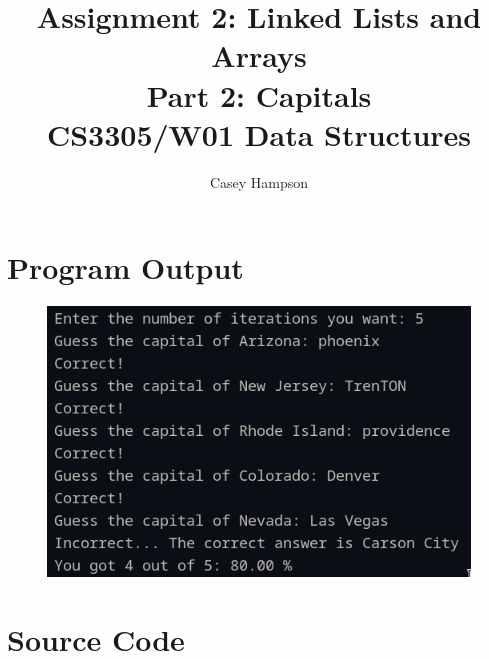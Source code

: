 \documentclass{article}
\title{Assignment 2: Linked Lists and Arrays \\[5pt] Part 2: Capitals \\[8pt] CS3305/W01 Data Structures}
\author{Casey Hampson}
\begin{document}
\maketitle



\section*{Program Output}

    \begin{figure}[htbp]
        \centering
        \includegraphics[scale=0.8]{res/1.png}
    \end{figure}

\pagebreak
\section*{Source Code}
\inputminted{java}{./P2.java}
\end{document}
